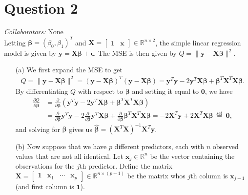 \documentclass[10pt]{article}
\newcommand{\mycolab}[1]{\textcolor{colabcol}{\textsl{Collaborators:}} #1\\}
\begin{document}
\section{Question 2} \noindent
\mycolab{None}
Letting \(\bm{\beta} = (\beta_0, \beta_1)^T\) and \(\mathbf{X} = \begin{bmatrix}
    \mathbf{1} & \mathbf{x}
\end{bmatrix} \in \mathbb{R}^{n\times2}\), the simple linear regression model is given by \(\mathbf{y} = \mathbf{X}\bm{\beta} + \bm{\epsilon}\). 
The MSE is then given by \(Q = \| \mathbf{y} - \mathbf{X}\bm{\beta} \|^2\). 
\begin{itemize}
    \item[(a)] We first expand the MSE to get
    \begin{align*}
        Q = \| \mathbf{y} - \mathbf{X}\bm{\beta} \|^2 = (\mathbf{y} - \mathbf{X}\bm{\beta})^T(\mathbf{y} - \mathbf{X}\bm{\beta})
        = \mathbf{y}^T\mathbf{y} - 2 \mathbf{y}^T \mathbf{X} \bm{\beta} + \bm{\beta}^T \mathbf{X}^T \mathbf{X} \bm{\beta}.
    \end{align*}
    By differentiating \(Q\) with respect to \(\bm{\beta}\) and setting it equal to \(\mathbf{0}\), we have
    \begin{align*}
        \frac{\partial Q}{\partial\bm{\beta}} 
        &= \frac{\partial}{\partial\bm{\beta}} \left( \mathbf{y}^T\mathbf{y} - 2 \mathbf{y}^T \mathbf{X} \bm{\beta} + \bm{\beta}^T \mathbf{X}^T \mathbf{X} \bm{\beta} \right) \\
        &= \frac{\partial}{\partial\bm{\beta}} \mathbf{y}^T\mathbf{y} - 2 \frac{\partial}{\partial\bm{\beta}}\mathbf{y}^T \mathbf{X} \bm{\beta} + \frac{\partial}{\partial\bm{\beta}}\bm{\beta}^T \mathbf{X}^T \mathbf{X} \bm{\beta}
        = -2 \mathbf{X}^T \mathbf{y} + 2 \mathbf{X}^T \mathbf{X} \bm{\beta}
        ~\overset{\text{set}}{=}~ \mathbf{0},
    \end{align*}
    and solving for \(\bm{\beta}\) gives us \(\hat{\bm{\beta}} = (\mathbf{X}^T\mathbf{X})^{-1}\mathbf{X}^T\mathbf{y}\).
    \item[(b)] Now suppose that we have \(p\) different predictors, each with \(n\) observed values that are not all identical. 
    Let \(\mathbf{x}_j \in \mathbb{R}^n\) be the vector containing the observations for the \(j\)th predictor. Define the matrix
    \(\mathbf{X} = \begin{bmatrix}
        \mathbf{1} & \mathbf{x}_1 & \cdots & \mathbf{x}_p
    \end{bmatrix} \in \mathbb{R}^{n\times(p+1)}\) be the matrix whos \(j\)th column is \(\mathbf{x}_{j-1}\) (and first column is \(\mathbf{1}\)).

\end{itemize}
\end{document}
